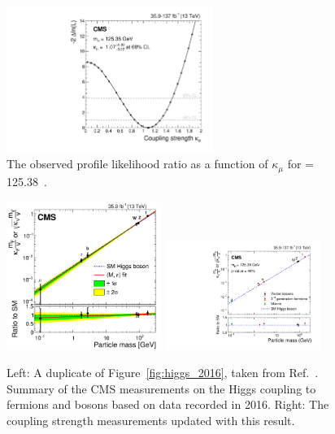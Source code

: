 \begin{figure}[!htb]
    \centering
    \captionsetup{justification=justified}
    \includegraphics[width=0.60\textwidth]{pics/results/kappa_mu.pdf}
    \caption{The observed profile likelihood ratio as a function of $\kappa_{\mu}$ for \mh = 125.38~\GeV.}
    \label{fig:kappa_scan}
\end{figure}

\begin{figure}[!htb]
    \centering
    \captionsetup{justification=justified}
    \includegraphics[width=0.45\textwidth]{pics/Intro/higgs_coupling_2016.png}
    \includegraphics[width=0.45\textwidth]{pics/results/higgs_coupling_new.pdf}
    \caption{Left: A duplicate of Figure~\ref{fig:higgs_2016}, taken from Ref.~\cite{Sirunyan:2640611}. 
             Summary of the CMS measurements on the Higgs coupling to fermions and bosons based on data recorded in 2016.
             Right: The coupling strength measurements updated with this \hmm result.}
    \label{fig:higgs_coupling_new}
\end{figure}

